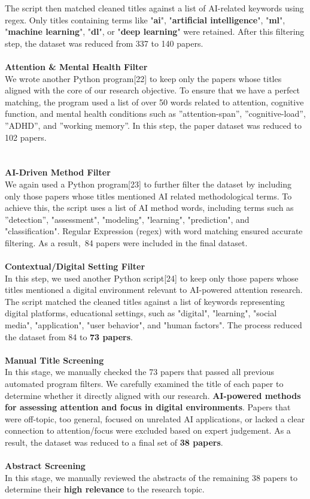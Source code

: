 \documentclass[twocolumn,12pt]{article}
\begin{document}
The script then matched cleaned titles against a list of AI-related keywords using regex. Only titles containing terms like "\textbf{ai}", "\textbf{artificial intelligence}", "\textbf{ml}", "\textbf{machine learning}", "\textbf{dl}", or "\textbf{deep learning}" were retained. After this filtering step, the dataset was reduced from 337 to 140 papers.
 \\ \\
\textbf{Attention \& Mental Health Filter} \\ 
We wrote another Python program[22] to keep only the papers whose titles aligned with the core of our research objective. To ensure that we have a perfect matching, the program used a list of over 50 words related to attention, cognitive function, and mental health conditions such as ”attention-span”, ”cognitive-load”, ”ADHD”, and ”working memory”. In this step, the paper dataset was reduced to 102 papers. \\ \\ \\
\textbf{AI-Driven Method Filter} \\ 
We again used a Python program[23] to further filter the dataset by including only those papers whose titles mentioned AI related methodological terms. To achieve this, the script uses a list of AI method words, including terms such as ”detection”, "assessment", "modeling", "learning", "prediction", and "classification". Regular Expression (regex) with word matching ensured accurate filtering. As a result, 84 papers were included in the final dataset. \\ \\
\textbf{Contextual/Digital Setting Filter} \\ 
In this step, we used another Python script[24] to keep only those papers whose titles mentioned a digital environment relevant to AI-powered attention research. The script matched the cleaned titles against a list of keywords representing digital platforms, educational settings, such as "digital", "learning", "social media", "application", "user behavior", and "human factors". The process reduced the dataset from 84 to \textbf{73 papers}. \\ \\
\textbf{Manual Title Screening} \\ 
In this stage, we manually checked the 73 papers that passed all previous automated program filters. We carefully examined the title of each paper to determine whether it directly aligned with our research. \textbf{AI-powered methods for assessing attention and focus in digital environments}. Papers that were off-topic, too general, focused on unrelated AI applications, or lacked a clear connection to attention/focus were excluded based on expert judgement. As a result, the dataset was reduced to a final set of \textbf{38 papers}. \\ \\
\textbf{Abstract Screening} \\ 
In this stage, we manually reviewed the abstracts of the remaining 38 papers to determine their \textbf{high relevance} to the research topic. 
\end{document}
